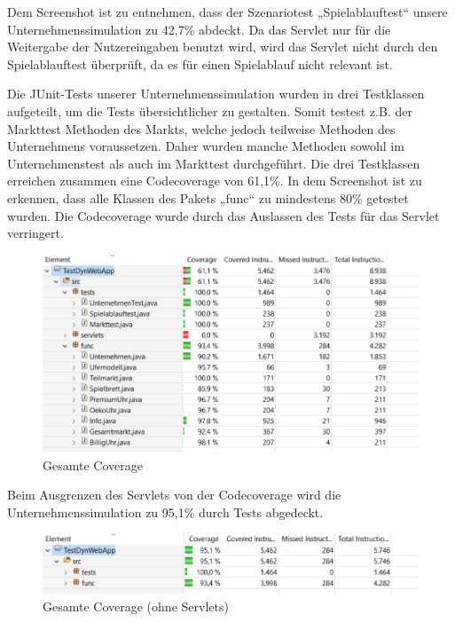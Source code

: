 Dem Screenshot ist zu entnehmen, dass der Szenariotest „Spielablauftest“ unsere Unternehmenssimulation zu 42,7\% abdeckt. Da das Servlet nur für die Weitergabe der Nutzereingaben benutzt wird, wird das Servlet nicht durch den Spielablauftest überprüft, da es für einen Spielablauf nicht relevant ist.   

Die JUnit-Tests unserer Unternehmenssimulation wurden in drei Testklassen aufgeteilt, um die Tests übersichtlicher zu gestalten. Somit testest z.B. der Markttest Methoden des Markts, welche jedoch teilweise Methoden des Unternehmens voraussetzen. Daher wurden manche Methoden sowohl im Unternehmenstest als auch im Markttest durchgeführt. Die drei Testklassen erreichen zusammen eine Codecoverage von 61,1\%. In dem Screenshot ist zu erkennen, dass alle Klassen des Pakets „func“ zu mindestens 80\% getestet wurden. Die Codecoverage wurde durch das Auslassen des Tests für das Servlet verringert. 

\begin{figure}[!h]
	\centering
	\includegraphics[scale=0.8]{img/bild2_tests.png} 
	\caption{Gesamte Coverage} \label{fig:abb32}
\end{figure}

Beim Ausgrenzen des Servlets von der Codecoverage wird die Unternehmenssimulation zu 95,1\% durch Tests abgedeckt. 

\begin{figure}[!h]
	\centering
	\includegraphics[scale=0.8]{img/bild3_tests.png} 
	\caption{Gesamte Coverage (ohne Servlets)} \label{fig:abb33}
\end{figure}







